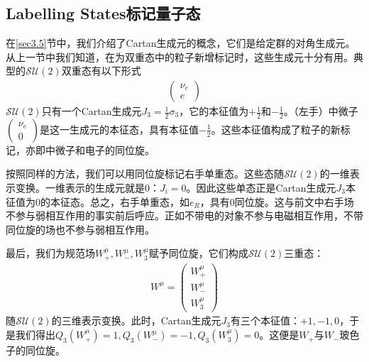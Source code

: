 \subsection[Labelling 态]{Labelling States\quad 标记量子态}\label{sec7.7.1}
在\ref{sec3.5}节中，我们介绍了Cartan生成元的概念，它们是给定群的对角生成元。从上一节中我们知道，在为双重态中的粒子新增标记时，这些生成元十分有用。典型的$\mathcal{SU}(2)$双重态有以下形式
\begin{align}
\begin{pmatrix}\nu_e \\ e\end{pmatrix}
\label{equ7.136}
\end{align}
$\mathcal{SU}(2)$只有一个Cartan生成元$J_3=\frac{1}{2}\sigma_3$，它的本征值为$+\frac{1}{2}$和$-\frac{1}{2}$。（左手）中微子$\begin{pmatrix}\nu_e\\0\end{pmatrix}$是这一生成元的本征态，具有本征值$-\frac{1}{2}$。这些本征值构成了粒子的新标记，亦即中微子和电子的同位旋。

按照同样的方法，我们可以用同位旋标记右手单重态。这些态随$\mathcal{SU}(2)$的一维表示变换。一维表示的生成元就是0：$J_i=0$。因此这些单态正是Cartan生成元$J_3$本征值为$0$的本征态。总之，右手单重态，如$e_R$，具有0同位旋。这与前文中右手场不参与弱相互作用的事实前后呼应。正如不带电的对象不参与电磁相互作用，不带同位旋的场也不参与弱相互作用。

最后，我们为规范场$W_+^\mu,W_-^\mu,W_3^\mu$赋予同位旋，它们构成$\mathcal{SU}(2)$三重态：
\begin{align}
W^\mu=\begin{pmatrix} W^\mu_+ \\ W^\mu_- \\ W^\mu_3\end{pmatrix}
\label{equ7.137}
\end{align}
随$\mathcal{SU}(2)$的三维表示变换。此时，Cartan生成元$J_3$有三个本征值：$+1,-1,0$，于是我们得出$Q_3(W^\mu_+)=1, Q_3(W^\mu_-)=-1, Q_3(W^\mu_3)=0$。这便是$W_+$与$W_-$玻色子的同位旋。

